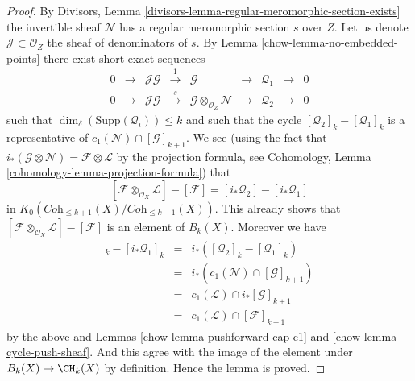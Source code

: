 \begin{proof}
\medskip\noindent
By Divisors, Lemma \ref{divisors-lemma-regular-meromorphic-section-exists}
the invertible sheaf $\mathcal{N}$ has a regular meromorphic section $s$
over $Z$. Let us denote $\mathcal{J} \subset \mathcal{O}_Z$ the sheaf
of denominators of $s$. By Lemma \ref{chow-lemma-no-embedded-points}
there exist short exact sequences
$$
\begin{matrix}
0 &
\to &
\mathcal{J}\mathcal{G} &
\xrightarrow{1} &
\mathcal{G} &
\to &
\mathcal{Q}_1 &
\to &
0 \\
0 &
\to &
\mathcal{J}\mathcal{G} &
\xrightarrow{s} &
\mathcal{G} \otimes_{\mathcal{O}_Z} \mathcal{N} &
\to &
\mathcal{Q}_2 &
\to &
0
\end{matrix}
$$
such that $\dim_\delta(\text{Supp}(\mathcal{Q}_i)) \leq k$ and
such that the cycle
$
[\mathcal{Q}_2]_k - [\mathcal{Q}_1]_k
$
is a representative of $c_1(\mathcal{N}) \cap [\mathcal{G}]_{k + 1}$.
We see (using the fact that
$i_*(\mathcal{G} \otimes \mathcal{N}) = \mathcal{F} \otimes \mathcal{L}$
by the projection formula, see
Cohomology, Lemma \ref{cohomology-lemma-projection-formula})
that
$$
[\mathcal{F} \otimes_{\mathcal{O}_X} \mathcal{L}]
-
[\mathcal{F}]
=
[i_*\mathcal{Q}_2] - [i_*\mathcal{Q}_1]
$$
in $K_0(\textit{Coh}_{\leq k + 1}(X)/\textit{Coh}_{\leq k - 1}(X))$.
This already shows that
$[\mathcal{F} \otimes_{\mathcal{O}_X} \mathcal{L}] - [\mathcal{F}]$
is an element of $B_k(X)$. Moreover we have
\begin{eqnarray*}
[i_*\mathcal{Q}_2]_k - [i_*\mathcal{Q}_1]_k
& = &
i_*\left( [\mathcal{Q}_2]_k - [\mathcal{Q}_1]_k \right) \\
& = &
i_*\left(c_1(\mathcal{N}) \cap [\mathcal{G}]_{k + 1} \right) \\
& = &
c_1(\mathcal{L}) \cap i_*[\mathcal{G}]_{k + 1} \\
& = &
c_1(\mathcal{L}) \cap [\mathcal{F}]_{k + 1}
\end{eqnarray*}
by the above and Lemmas \ref{chow-lemma-pushforward-cap-c1}
and \ref{chow-lemma-cycle-push-sheaf}. And this agree with the
image of the element under $B_k(X) \to \CH_k(X)$ by definition.
Hence the lemma is proved.
\end{proof}



